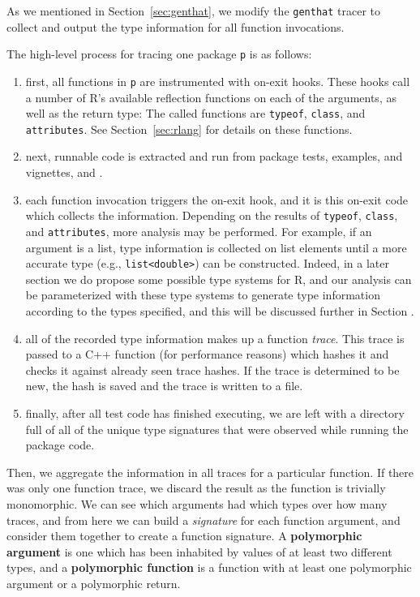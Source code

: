\documentclass[acmsmall,10pt,review,anonymous]{acmart}\settopmatter{printfolios=true,printccs=false,printacmref=false}
\begin{document}
As we mentioned in Section~\ref{sec:genthat}, we modify the {\tt genthat} tracer to collect and output the type information for all function invocations.

The high-level process for tracing one package {\tt p} is as follows:

\begin{enumerate}
	\item first, all functions in {\tt p} are instrumented with on-exit hooks.
  	These hooks call a number of R's available reflection functions on each of the arguments, as well as the return type: 
  	The called functions are {\tt typeof}, {\tt class}, and {\tt attributes}.  
  	See Section~\ref{sec:rlang} for details on these functions.
  
  	\item next, runnable code is extracted and run from package tests, examples, and vignettes, and .
  
	\item each function invocation triggers the on-exit hook, and it is this on-exit code which collects the information.
	Depending on the results of {\tt typeof}, {\tt class}, and {\tt attributes}, more analysis may be performed.
	For example, if an argument is a list, type information is collected on list elements until a more accurate type (e.g., {\tt list<double>}) can be constructed.
	Indeed, in a later section we do propose some possible type systems for R, and our analysis can be parameterized with these type systems to generate type information according to the types specified, and this will be discussed further in Section .
	
	\item all of the recorded type information makes up a function {\it trace}.
	This trace is passed to a C++ function (for performance reasons) which hashes it and checks it against already seen trace hashes.
	If the trace is determined to be new, the hash is saved and the trace is written to a file.
	
	\item finally, after all test code has finished executing, we are left with a directory full of all of the unique type signatures that were observed while running the package code.
	
\end{enumerate}



Then, we aggregate the information in all traces for a particular function.
If there was only one function trace, we discard the result as the function
is trivially monomorphic.  We can see which arguments had which types over
how many traces, and from here we can build a \textit{signature} for each
function argument, and consider them together to create a function
signature.  A \textbf{polymorphic argument} is one which has been inhabited
by values of at least two different types, and a \textbf{polymorphic
  function} is a function with at least one polymorphic argument or a
polymorphic return.
\end{document}
